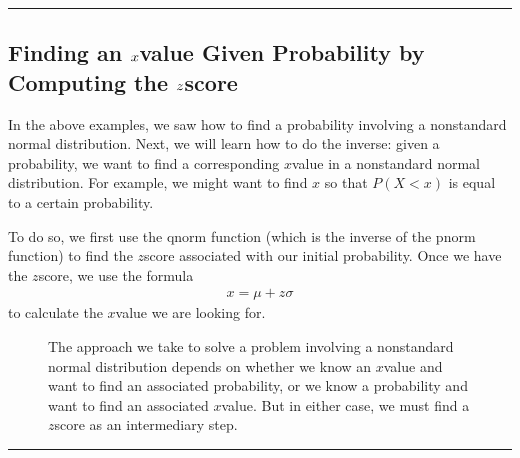 \documentclass[letterpaper,10pt,english]{jupyterBook}
\begin{document}
\bigskip\hrule\bigskip



\subsection{Finding an \protect\(x\protect\)\sphinxhyphen{}value Given Probability by Computing the \protect\(z\protect\)\sphinxhyphen{}score}
\label{\detokenize{Ch4 The Normal Distribution and the Central Limit Theorem/4.3 The Normal Distribution and z-scores:finding-an-x-value-given-probability-by-computing-the-z-score}}
\sphinxAtStartPar
In the above examples, we saw how to find a probability involving a non\sphinxhyphen{}standard normal distribution. Next, we will learn how to do the inverse: given a probability, we want to find a corresponding \(x\)\sphinxhyphen{}value in a non\sphinxhyphen{}standard normal distribution. For example, we might want to find \(x\) so that \(P(X < x)\) is equal to a certain probability.

\sphinxAtStartPar
To do so, we first use the qnorm function (which is the inverse of the pnorm function) to find the \(z\)\sphinxhyphen{}score associated with our initial probability. Once we have the \(z\)\sphinxhyphen{}score, we use the formula
\begin{equation*}
\begin{split} x = \mu + z\sigma \end{split}
\end{equation*}
\sphinxAtStartPar
to calculate the \(x\)\sphinxhyphen{}value we are looking for.

\begin{figure}[htbp]
\centering
\capstart

\noindent{}
\caption{The approach we take to solve a problem involving a non\sphinxhyphen{}standard normal distribution depends on whether we know an \(x\)\sphinxhyphen{}value and want to find an associated probability, or we know a probability and want to find an associated \(x\)\sphinxhyphen{}value. But in either case, we must find a \(z\)\sphinxhyphen{}score as an intermediary step.}\label{\detokenize{Ch4 The Normal Distribution and the Central Limit Theorem/4.3 The Normal Distribution and z-scores:pnorm-qnorm-zscore}}\end{figure}


\bigskip\hrule\bigskip
\end{document}
